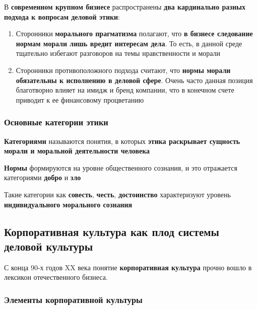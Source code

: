 \documentclass[a4paper,14pt]{extarticle}
\begin{document}
В \textbf{современном крупном бизнесе} распространены \textbf{два кардинально разных подхода к вопросам деловой этики}:

\begin{enumerate}
    \item Сторонники \textbf{морального прагматизма} полагают, что \textbf{в бизнесе следование нормам морали лишь вредит интересам дела}. То есть, в данной среде тщательно избегают разговоров на темы нравственности и морали
    \item Сторонники противоположного подхода считают, что \textbf{нормы морали обязательны к исполнению в деловой сфере}. Очень часто данная позиция благотворно влияет на имидж и бренд компании, что в конечном счете приводит к ее финансовому процветанию
\end{enumerate}

\subsubsection{Основные категории этики}

\begin{multienumerate}
\end{multienumerate}

\textbf{Категориями} называются понятия, в которых \textbf{этика раскрывает сущность морали и моральной деятельности человека}

\textbf{Нормы} формируются на уровне общественного сознания, и это отражается категориями \textbf{добро} и \textbf{зло}

Такие категории как \textbf{совесть}, \textbf{честь}, \textbf{достоинство} характеризуют уровень \textbf{индивидуального морального сознания}

\subsection{Корпоративная культура как плод системы деловой культуры}

С конца 90-х годов XX века понятие \textbf{корпоративная культура} прочно вошло в лексикон отечественного бизнеса.

\subsubsection{Элементы корпоративной культуры}
\end{document}
